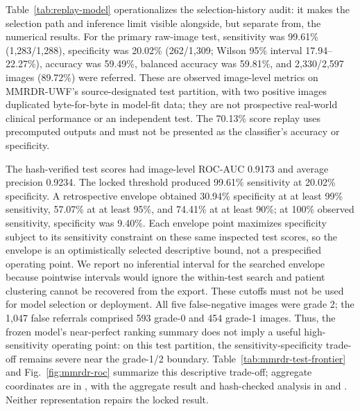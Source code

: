 \documentclass[11pt]{article}
\begin{document}
Table~\ref{tab:replay-model} operationalizes the selection-history audit: it makes the selection path and inference limit visible alongside, but separate from, the numerical results. For the primary raw-image test, sensitivity was 99.61\% (1,283/1,288), specificity was 20.02\% (262/1,309; Wilson 95\% interval 17.94--22.27\%), accuracy was 59.49\%, balanced accuracy was 59.81\%, and 2,330/2,597 images (89.72\%) were referred. These are observed image-level metrics on MMRDR-UWF's source-designated test partition, with two positive images duplicated byte-for-byte in model-fit data; they are not prospective real-world clinical performance or an independent test. The 70.13\% score replay uses precomputed outputs and must not be presented as the classifier's accuracy or specificity.

The hash-verified test scores had image-level ROC-AUC 0.9173 and average precision 0.9234. The locked threshold produced 99.61\% sensitivity at 20.02\% specificity. A retrospective envelope obtained 30.94\% specificity at at least 99\% sensitivity, 57.07\% at at least 95\%, and 74.41\% at at least 90\%; at 100\% observed sensitivity, specificity was 9.40\%. Each envelope point maximizes specificity subject to its sensitivity constraint on these same inspected test scores, so the envelope is an optimistically selected descriptive bound, not a prespecified operating point. We report no inferential interval for the searched envelope because pointwise intervals would ignore the within-test search and patient clustering cannot be recovered from the export. These cutoffs must not be used for model selection or deployment. All five false-negative images were grade 2; the 1,047 false referrals comprised 593 grade-0 and 454 grade-1 images. Thus, the frozen model's near-perfect ranking summary does not imply a useful high-sensitivity operating point: on this test partition, the sensitivity-specificity trade-off remains severe near the grade-1/2 boundary. Table~\ref{tab:mmrdr-test-frontier} and Fig.~\ref{fig:mmrdr-roc} summarize this descriptive trade-off; aggregate coordinates are in , with the aggregate result and hash-checked analysis in  and . Neither representation repairs the locked result.
\end{document}
